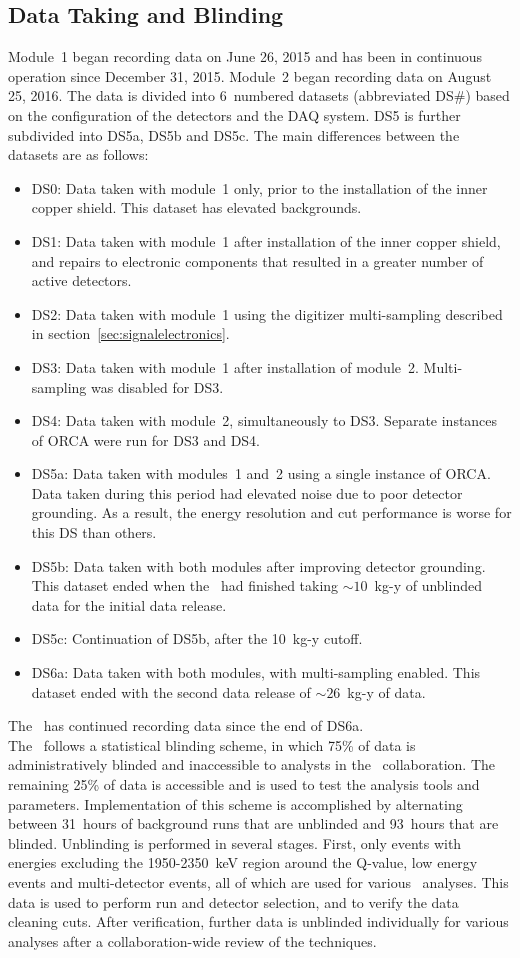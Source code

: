\documentclass[/main.tex]{subfiles}
\begin{document}
\subsection{Data Taking and Blinding}
Module~1 began recording data on June 26, 2015 and has been in continuous operation since December 31, 2015.
Module~2 began recording data on August 25, 2016.
The data is divided into 6~numbered datasets (abbreviated DS\#) based on the configuration of the detectors and the DAQ system.
DS5 is further subdivided into DS5a, DS5b and DS5c.
The main differences between the datasets are as follows:
\begin{itemize}
\item DS0: Data taken with module~1 only, prior to the installation of the inner copper shield. This dataset has elevated backgrounds.
\item DS1: Data taken with module~1 after installation of the inner copper shield, and repairs to electronic components that resulted in a greater number of active detectors.
\item DS2: Data taken with module~1 using the digitizer multi-sampling described in section~\ref{sec:signalelectronics}.
\item DS3: Data taken with module~1 after installation of module~2. Multi-sampling was disabled for DS3.
\item DS4: Data taken with module~2, simultaneously to DS3. Separate instances of ORCA were run for DS3 and DS4.
\item DS5a: Data taken with modules~1 and~2 using a single instance of ORCA. Data taken during this period had elevated noise due to poor detector grounding. As a result, the energy resolution and cut performance is worse for this DS than others.
\item DS5b: Data taken with both modules after improving detector grounding. This dataset ended when the \MJD\ had finished taking $\sim10$~kg-y of unblinded data for the initial data release.
\item DS5c: Continuation of DS5b, after the 10~kg-y cutoff.
\item DS6a: Data taken with both modules, with multi-sampling enabled. This dataset ended with the second data release of $\sim26$~kg-y of data.
\end{itemize}
The \MJD\ has continued recording data since the end of DS6a.
\\
The \MJD\ follows a statistical blinding scheme, in which 75\% of data is administratively blinded and inaccessible to analysts in the \MJ\ collaboration.
The remaining 25\% of data is accessible and is used to test the analysis tools and parameters.
Implementation of this scheme is accomplished by alternating between 31~hours of background runs that are unblinded and 93~hours that are blinded.
Unblinding is performed in several stages.
First, only events with energies excluding the 1950-2350~keV region around the Q-value, low energy events and multi-detector events, all of which are used for various \MJD\ analyses.
This data is used to perform run and detector selection, and to verify the data cleaning cuts.
After verification, further data is unblinded individually for various analyses after a collaboration-wide review of the techniques.
\\
\end{document}
